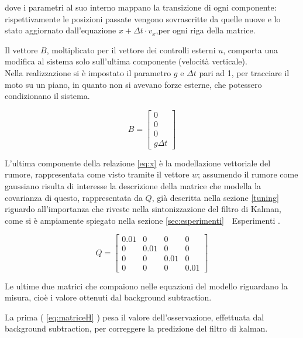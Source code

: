 dove i parametri al suo interno mappano la transizione di ogni componente: rispettivamente le posizioni passate vengono sovrascritte da quelle nuove e lo stato aggiornato dall'equazione $x + \Delta t \cdot v_x$,per ogni riga della matrice.

Il vettore $B$, moltiplicato per il vettore dei controlli esterni $u$, comporta una modifica al sistema solo sull'ultima componente (velocità verticale).\\%
Nella realizzazione si è impostato il parametro $g$  e $ \Delta t$ pari ad 1, per tracciare il moto su un piano, in quanto non si avevano forze esterne, che potessero condizionano il sistema. 

\begin{equation}
 B =\begin{bmatrix} 0 \\ 0 \\ 0 \\ g \Delta t \end{bmatrix}\end{equation} 

L'ultima componente della relazione \ref{eq:x} è la modellazione vettoriale del rumore, rappresentata come visto tramite il vettore $w$; assumendo il rumore come gaussiano risulta di interesse la descrizione della matrice che modella la covarianza di questo, rappresentata da $Q$, già descritta nella sezione \ref{tuning} riguardo all'importanza che riveste nella sintonizzazione del filtro di Kalman, come si è ampiamente spiegato nella sezione \ref{sec:esperimenti}~~Esperimenti .

 
\begin{equation}
Q = \begin{bmatrix} 
0.01 & 0 & 0 & 0\\
0 & 0.01 & 0 & 0\\
0 & 0 & 0.01 & 0\\
0 & 0 & 0 & 0.01
\end{bmatrix}\end{equation} 




Le ultime due matrici che compaiono nelle equazioni del modello riguardano la misura, cioè i valore ottenuti dal background subtraction. 

La prima ( \ref{eq:matriceH} ) pesa il valore dell'osservazione, effettuata dal background subtraction, per correggere la predizione del filtro di kalman.

